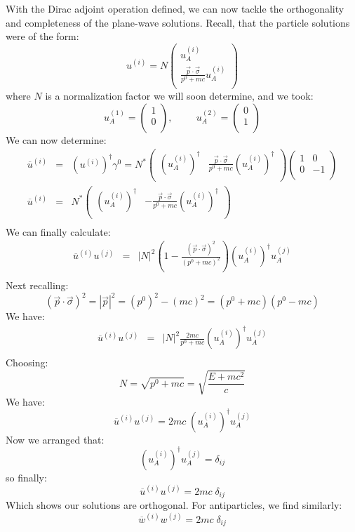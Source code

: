 \documentclass[12pt]{book}
\begin{document}
With the Dirac adjoint operation defined, we can now tackle the orthogonality and completeness of the plane-wave solutions.  Recall, that the particle solutions were of the form:
$$u^{(i)} = N \begin{pmatrix}  \displaystyle u_A^{(i)} \\[5pt] \displaystyle \frac{\vec{p}\cdot\vec{\sigma}}{p^0 + mc} u_A^{(i)}\\ \end{pmatrix}$$
where $N$ is a normalization factor we will soon determine, and we took:
$$u_A^{(1)}=\begin{pmatrix} 1 \\ 0 \\ \end{pmatrix}, \hspace{1cm} u_A^{(2)}=\begin{pmatrix} 0 \\ 1 \\ \end{pmatrix}$$
We can now determine:
\begin{eqnarray*}
\overline{u}^{(i)} &=& (u^{(i)})^\dagger \gamma^0 = 
N^*
\begin{pmatrix} 
\displaystyle (u_A^{(i)})^\dagger & \displaystyle \frac{\vec{p}\cdot\vec{\sigma}}{p^0 + mc} (u_A^{(i)})^\dagger \\
\end{pmatrix}
\begin{pmatrix} 1 & 0 \\ 0 & -1 \\ \end{pmatrix}\\
\overline{u}^{(i)} &=& N^* \begin{pmatrix} 
\displaystyle (u_A^{(i)})^\dagger & \displaystyle -\frac{\vec{p}\cdot\vec{\sigma}}{p^0 + mc} (u_A^{(i)})^\dagger \\
\end{pmatrix} \\
\end{eqnarray*}
We can finally calculate:
\begin{eqnarray*}
\overline{u}^{(i)} u^{(j)} &=& |N|^2 \left( 1 - \frac{(\vec{p}\cdot \vec{\sigma})^2}{(p^0+mc)^2}\right) (u_A^{(i)})^\dagger u_A^{(j)}\\ 
\end{eqnarray*}
Next recalling:
$$(\vec{p}\cdot \vec{\sigma})^2 = |\vec{p}|^2 = (p^0)^2-(mc)^2 = (p^0+mc)(p^0-mc)$$
We have:
\begin{eqnarray*}
\overline{u}^{(i)} u^{(j)} &=& |N|^2 \frac{2mc}{p^0+mc} (u_A^{(i)})^\dagger u_A^{(j)}\\ 
\end{eqnarray*}
Choosing:
$$N = \sqrt{p^0+mc} = \sqrt{\frac{E+mc^2}{c}}$$
We have:
$$\overline{u}^{(i)} u^{(j)} = 2mc \; (u_A^{(i)})^\dagger u_A^{(j)}$$
Now we arranged that:
$$(u_A^{(i)})^\dagger u_A^{(j)} = \delta_{ij}$$
so finally:
$$\overline{u}^{(i)} u^{(j)} = 2mc \; \delta_{ij}$$
Which shows our solutions are orthogonal.  For antiparticles, we find similarly:
$$\overline{w}^{(i)} w^{(j)} = 2mc \; \delta_{ij}$$
\end{document}
